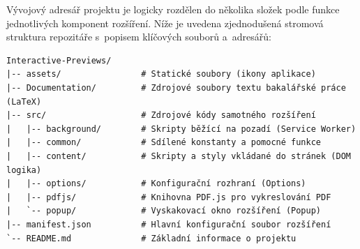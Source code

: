 \documentclass[a4paper,12pt]{article}
\begin{document}
%
%
%	
%

\fi									%




\listofappendices


\backmatter%

\label{priloha:struktura}

Vývojový adresář projektu je logicky rozdělen do několika složek podle funkce jednotlivých komponent rozšíření. Níže je uvedena zjednodušená stromová struktura repozitáře s~popisem klíčových souborů a~adresářů:

\begin{lstlisting}[language={}, numbers=none, basicstyle=\ttfamily\small]
Interactive-Previews/
|-- assets/                # Statické soubory (ikony aplikace)
|-- Documentation/         # Zdrojové soubory textu bakalářské práce (LaTeX)
|-- src/                   # Zdrojové kódy samotného rozšíření
|   |-- background/        # Skripty běžící na pozadí (Service Worker)
|   |-- common/            # Sdílené konstanty a pomocné funkce
|   |-- content/           # Skripty a styly vkládané do stránek (DOM logika)
|   |-- options/           # Konfigurační rozhraní (Options)
|   |-- pdfjs/             # Knihovna PDF.js pro vykreslování PDF
|   `-- popup/             # Vyskakovací okno rozšíření (Popup)
|-- manifest.json          # Hlavní konfigurační soubor rozšíření
`-- README.md              # Základní informace o projektu
\end{lstlisting}
\end{document}
